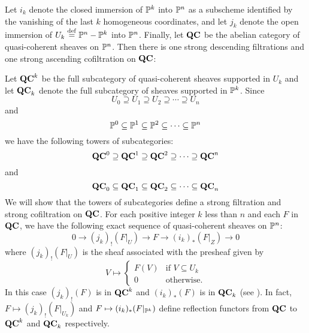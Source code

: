 \begin{ex}
Let $i_k$ denote the closed immersion of $\P^k$ into $\P^n$ as a
subscheme identified by the vanishing of the last $k$ homogeneous
coordinates, and let $j_k$ denote the open immersion of $U_k \defeq 
\P^n - \P^k$ into $\P^n$. Finally, let $\QCoh$ be the abelian 
category of quasi-coherent sheaves on $\P^n$. Then there is one 
strong descending filtrations and one strong ascending 
cofiltration on $\QCoh$:

Let $\QCoh^k$ be the full subcategory of quasi-coherent sheaves
supported in $U_k$ and let $\QCoh_k$ denote the full subcategory
of sheaves supported in $\P^k$. Since 
\[
U_0 \supseteq U_1 \supseteq U_2 \supseteq \cdots \supseteq U_n
\]
and
\[
\P^0 \subseteq \P^1 \subseteq \P^2 \subseteq \cdots \subseteq \P^n
\]
we have the following towers of subcategories:
\[
\QCoh^0 \supseteq \QCoh^1 \supseteq \QCoh^2 \supseteq \cdots
   \supseteq \QCoh^n
\]
and 
\[
\QCoh_0 \subseteq \QCoh_1 \subseteq \QCoh_2 \subseteq \cdots
   \subseteq \QCoh_n
\]
We will show that the towers of subcategories define a strong 
filtration and strong cofiltration on $\QCoh$. For each positive 
integer $k$ less than $n$ and each $F$ in $\QCoh$, we have the 
following exact sequence of quasi-coherent sheaves on $\P^n$:
\begin{equation}\label{eq_qc_sheaf_ses}
0 \to (j_k)_!(F|_U) \to F \to (i_k)_*(F|_Z) \to 0
\end{equation}
where $(j_k)_!(F|_U)$ is the sheaf associated with the presheaf 
given by
\[
V \mapsto \begin{cases}
F(V) &\textrm{if }V \subseteq U_k\\
0    &\textrm{otherwise}.
\end{cases}
\]
In this case $(j_k)_!(F)$ is in $\QCoh^k$ and $(i_k)_*(F)$ is in 
$\QCoh_k$ (see \cite[Ex. 1.19]{Hart}). In fact, $F \mapsto 
(j_k)_!(F|_{U_k})$ and $F \mapsto (i_k)_*(F|_{\P^k})$ define
reflection functors from $\QCoh$ to $\QCoh^k$ and $\QCoh_k$
respectively.


\end{ex}
